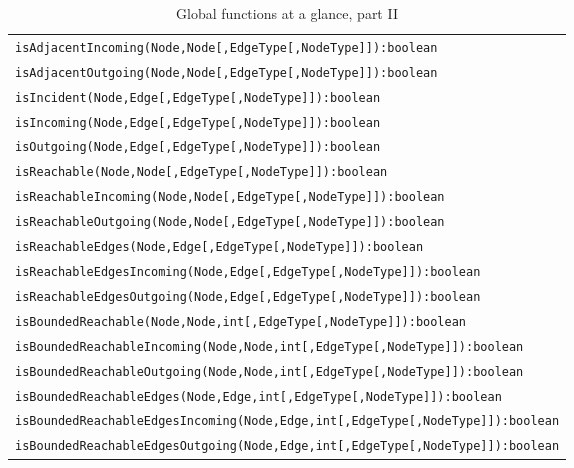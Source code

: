 \begin{table}[htbp]
\begin{tabular}{|l|}
\texttt{isAdjacentIncoming(Node,Node[,EdgeType[,NodeType]]):boolean}\\
\texttt{isAdjacentOutgoing(Node,Node[,EdgeType[,NodeType]]):boolean}\\
\texttt{isIncident(Node,Edge[,EdgeType[,NodeType]]):boolean}\\
\texttt{isIncoming(Node,Edge[,EdgeType[,NodeType]]):boolean}\\
\texttt{isOutgoing(Node,Edge[,EdgeType[,NodeType]]):boolean}\\
\hline
\texttt{isReachable(Node,Node[,EdgeType[,NodeType]]):boolean}\\
\texttt{isReachableIncoming(Node,Node[,EdgeType[,NodeType]]):boolean}\\
\texttt{isReachableOutgoing(Node,Node[,EdgeType[,NodeType]]):boolean}\\
\texttt{isReachableEdges(Node,Edge[,EdgeType[,NodeType]]):boolean}\\
\texttt{isReachableEdgesIncoming(Node,Edge[,EdgeType[,NodeType]]):boolean}\\
\texttt{isReachableEdgesOutgoing(Node,Edge[,EdgeType[,NodeType]]):boolean}\\
\hline
\texttt{isBoundedReachable(Node,Node,int[,EdgeType[,NodeType]]):boolean}\\
\texttt{isBoundedReachableIncoming(Node,Node,int[,EdgeType[,NodeType]]):boolean}\\
\texttt{isBoundedReachableOutgoing(Node,Node,int[,EdgeType[,NodeType]]):boolean}\\
\texttt{isBoundedReachableEdges(Node,Edge,int[,EdgeType[,NodeType]]):boolean}\\
\texttt{isBoundedReachableEdgesIncoming(Node,Edge,int[,EdgeType[,NodeType]]):boolean}\\
\texttt{isBoundedReachableEdgesOutgoing(Node,Edge,int[,EdgeType[,NodeType]]):boolean}\\
\hline
\end{tabular}
\caption{Global functions at a glance, part II}
\label{funcstab2}
\end{table}

